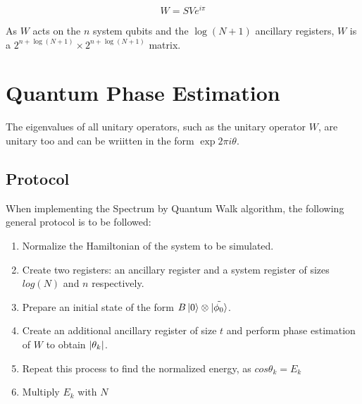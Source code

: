 $$
W = SVe^{i\pi}
$$

As $W$ acts on the $n$ system qubits and the $\log(N + 1)$  ancillary registers, $W$ is a $ 2^{n+ \log(N+1)} \times 2^{n + \log(N+1)}$ matrix.



\section{Quantum Phase Estimation}

The eigenvalues of all unitary operators, such as the unitary operator $W$, are unitary too and can be wriitten in the form $\exp{2\pi i \theta}$.


%
%
%



\subsection{Protocol}


When implementing the Spectrum by Quantum Walk algorithm, the following general protocol is to be followed:

\begin{enumerate}
  \item Normalize the Hamiltonian of the system to be simulated.
  \item Create two registers: an ancillary register and a system register of sizes $log(N)$ and $n$ respectively.
  \item Prepare an initial state of the form $ B \left\vert{0}\right\rangle \otimes \tilde{\left\vert{\phi_0}\right\rangle}$.
  \item Create an additional ancillary register of size $t$ and perform phase estimation of $W$ to obtain $\abs{\theta_k}$.
  \item Repeat this process to find the normalized energy, as $cos \theta_k = E_k$
  \item Multiply $E_k$ with $N$
\end{enumerate}


